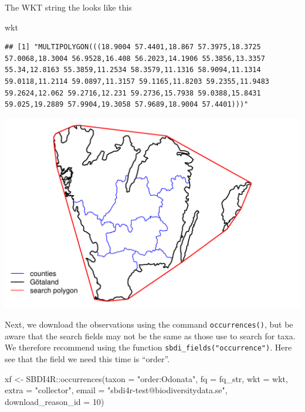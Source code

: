 \documentclass[
  10pt,
]{article}
\newenvironment{Shaded}{\begin{snugshade}}{\end{snugshade}}
\newcommand{\AttributeTok}[1]{\textcolor[rgb]{0.77,0.63,0.00}{#1}}
\newcommand{\DecValTok}[1]{\textcolor[rgb]{0.00,0.00,0.81}{#1}}
\newcommand{\FunctionTok}[1]{\textcolor[rgb]{0.00,0.00,0.00}{#1}}
\newcommand{\NormalTok}[1]{#1}
\newcommand{\OtherTok}[1]{\textcolor[rgb]{0.56,0.35,0.01}{#1}}
\newcommand{\SpecialCharTok}[1]{\textcolor[rgb]{0.00,0.00,0.00}{#1}}
\newcommand{\StringTok}[1]{\textcolor[rgb]{0.31,0.60,0.02}{#1}}
\begin{document}
The WKT string the looks like this

\begin{Shaded}
\begin{Highlighting}[]
\NormalTok{wkt}
\end{Highlighting}
\end{Shaded}

\begin{verbatim}
## [1] "MULTIPOLYGON(((18.9004 57.4401,18.867 57.3975,18.3725 57.0068,18.3004 56.9528,16.408 56.2023,14.1906 55.3856,13.3357 55.34,12.8163 55.3859,11.2534 58.3579,11.1316 58.9094,11.1314 59.0118,11.2114 59.0897,11.3157 59.1165,11.8203 59.2355,11.9483 59.2624,12.062 59.2716,12.231 59.2736,15.7938 59.0388,15.8431 59.025,19.2889 57.9904,19.3058 57.9689,18.9004 57.4401)))"
\end{verbatim}

\includegraphics{r-tools-tutorial_files/figure-latex/searchpoly-1.pdf}

Next, we download the observations using the command \texttt{occurrences()}, but be aware that
the search fields may not be the same as those use to search for taxa. We therefore
recommend using the function \texttt{sbdi\_fields("occurrence")}. Here see that the field
we need this time is ``order''.

\begin{Shaded}
\begin{Highlighting}[]
\NormalTok{xf }\OtherTok{\textless{}{-}}\NormalTok{ SBDI4R}\SpecialCharTok{::}\FunctionTok{occurrences}\NormalTok{(}\AttributeTok{taxon =} \StringTok{"order:Odonata"}\NormalTok{, }
                  \AttributeTok{fq =}\NormalTok{ fq\_str,}
                  \AttributeTok{wkt =}\NormalTok{ wkt,}
                  \AttributeTok{extra =} \StringTok{"collector"}\NormalTok{,}
                  \AttributeTok{email =} \StringTok{"sbdi4r{-}test@biodiversitydata.se"}\NormalTok{, }
                  \AttributeTok{download\_reason\_id =} \DecValTok{10}\NormalTok{)}
\end{Highlighting}
\end{Shaded}
\end{document}
